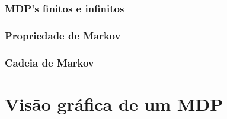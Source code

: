 \documentclass{article}
\begin{document}
            \subsubsection{MDP's finitos e infinitos}
            
            \subsubsection{Propriedade de Markov}
            
            \subsubsection{Cadeia de Markov}
        
    \section{Visão gráfica de um MDP}
    
\end{document}
